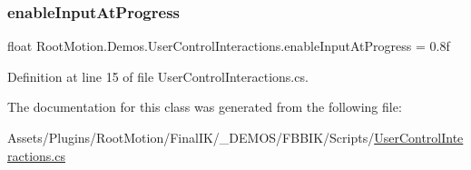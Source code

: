 \subsubsection{\texorpdfstring{enable\+Input\+At\+Progress}{enableInputAtProgress}}
{\footnotesize\ttfamily float Root\+Motion.\+Demos.\+User\+Control\+Interactions.\+enable\+Input\+At\+Progress = 0.\+8f}



Definition at line 15 of file User\+Control\+Interactions.\+cs.



The documentation for this class was generated from the following file\+:\begin{DoxyCompactItemize}
\item 
Assets/\+Plugins/\+Root\+Motion/\+Final\+I\+K/\+\_\+\+D\+E\+M\+O\+S/\+F\+B\+B\+I\+K/\+Scripts/\mbox{\hyperlink{_user_control_interactions_8cs}{User\+Control\+Interactions.\+cs}}\end{DoxyCompactItemize}
